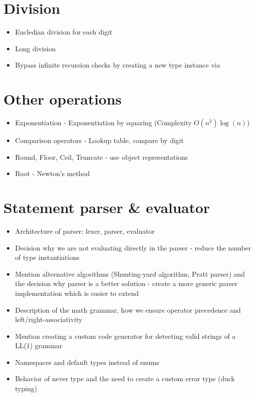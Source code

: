 \section{Division}

\begin{itemize}
  \item Eucledian division for each digit
  \item Long division
  \item Bypass infinite recursion checks by creating a new type instance via 
\end{itemize}

\section{Other operations}

\begin{itemize}
  \item Exponentiation - Exponentiation by squaring (Complexity $O(n^2)\log(n)$)
  \item Comparison operators - Lookup table, compare by digit
  \item Round, Floor, Ceil, Truncate - use object representations
  \item Root - Newton's method
\end{itemize}

\section{Statement parser \& evaluator}

\begin{itemize}
  \item Architecture of parser: lexer, parser, evaluator
  \item Decision why we are not evaluating directly in the parser - reduce the number of type instantiations
  \item Mention alternative algorithms (Shunting-yard algorithm, Pratt parser) and the decision why parser is a better solution - create a more generic parser implementation which is easier to extend
  \item Description of the math grammar, how we ensure operator precedence and left/right-associativity
  \item Mention creating a custom code generator for detecting valid strings of a LL(1) grammar
  \item Namespaces and default types instead of enums 
  \item Behavior of never type and the need to create a custom error type (duck typing)
\end{itemize}

